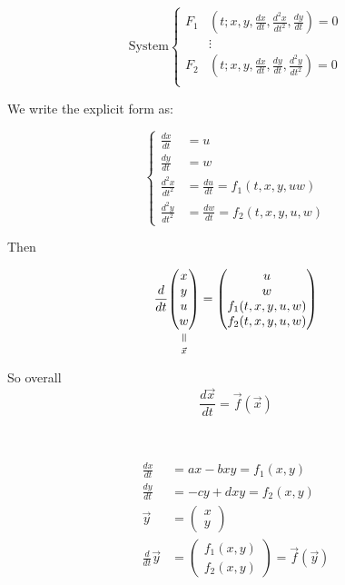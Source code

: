 \documentclass[twoside]{scrartcl}
\begin{document}
\begin{example}
\[
\text{System}
\left\{
\begin{aligned}
F_1&\left(t; x,y, \frac{dx}{dt}, \frac{d^2x}{dt^2}, \frac{dy}{dt}\right) = 0\\
&\vdots\\
F_2&\left(t; x, y, \frac{dx}{dt}, \frac{dy}{dt}, \frac{d^2y}{dt^2}\right) = 0\\
\end{aligned}\right.
\]

We write the explicit form as: 

\[
\left\{
\begin{aligned}
  \frac{dx}{dt} &= u\\
  \frac{dy}{dt} &= w\\
  \frac{d^2x}{dt^2} &= \frac{du}{dt} = f_1(t, x, y, u w)\\
  \frac{d^2y}{dt^2} &= \frac{dw}{dt} = f_2(t,x,y,u,w)
\end{aligned}
\right. \]

Then 

\[\frac{d}{dt}\equalto{\begin{pmatrix}
x \\ y \\ u \\ w	
\end{pmatrix}}{\vec{x}}
= \begin{pmatrix}
 u \\ w\\ 
 f_1(t,x,y,u,w)\\
 f_2(t,x,y,u,w)	
 \end{pmatrix}
\]

So overall 
\[\boxed{\frac{d\vec{x}}{dt} = \vec{f}(\vec{x}) }\]
\end{example}~\vspace*{5pt}


\begin{example}
\[
\begin{aligned}
  \frac{dx}{dt} &= ax - bxy = f_1(x,y)\\
  \frac{dy}{dt} &= -cy + dxy = f_2(x,y)\\
  \vec{y} &= \begin{pmatrix} x \\ y \end{pmatrix}\\
  \frac{d}{dt}\vec{y} &= \begin{pmatrix}
 f_1(x,y) \\ f_2(x,y)	
 \end{pmatrix} = \vec{f}(\vec{y})
\end{aligned}
\]	
\end{example}
\end{document}
